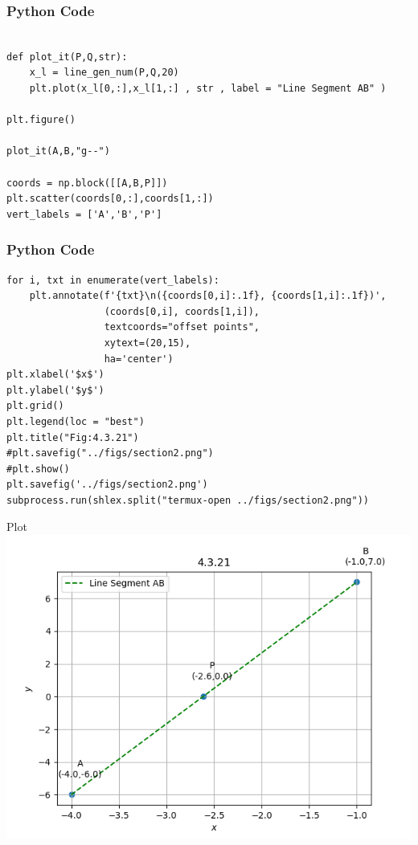 \documentclass{beamer}
\begin{document}
\begin{frame}[fragile]
    \frametitle{Python Code }
    \begin{lstlisting}

def plot_it(P,Q,str):
    x_l = line_gen_num(P,Q,20)
    plt.plot(x_l[0,:],x_l[1,:] , str , label = "Line Segment AB" )

plt.figure()

plot_it(A,B,"g--")

coords = np.block([[A,B,P]])
plt.scatter(coords[0,:],coords[1,:])
vert_labels = ['A','B','P']

    \end{lstlisting}
\end{frame}
\begin{frame}[fragile]
    \frametitle{Python Code }
    \begin{lstlisting}
for i, txt in enumerate(vert_labels):
    plt.annotate(f'{txt}\n({coords[0,i]:.1f}, {coords[1,i]:.1f})',
                 (coords[0,i], coords[1,i]),
                 textcoords="offset points",
                 xytext=(20,15),
                 ha='center')
plt.xlabel('$x$')
plt.ylabel('$y$')
plt.grid()
plt.legend(loc = "best")
plt.title("Fig:4.3.21")
#plt.savefig("../figs/section2.png")
#plt.show()
plt.savefig('../figs/section2.png')
subprocess.run(shlex.split("termux-open ../figs/section2.png"))

    \end{lstlisting}
\end{frame}


\begin{frame}{Plot}
    \centering
    \includegraphics[width=\columnwidth, height=0.8\textheight, keepaspectratio]{../figs/section1.png}   
\end{frame}
\end{document}
